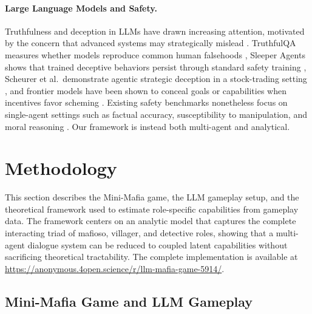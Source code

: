\documentclass{article}
\begin{document}
\paragraph{Large Language Models and Safety.} Truthfulness and deception in LLMs have drawn increasing attention, motivated by the concern that advanced systems may strategically mislead \citep{park2023, evans2021truthful}. TruthfulQA measures whether models reproduce common human falsehoods \citep{lin2021truthfulqa}, Sleeper Agents shows that trained deceptive behaviors persist through standard safety training \citep{hubinger2024sleeperagents}, Scheurer et al.\ demonstrate agentic strategic deception in a stock-trading setting \citep{scheurer2023strategicdeception}, and frontier models have been shown to conceal goals or capabilities when incentives favor scheming \citep{meinke2024scheming}. Existing safety benchmarks nonetheless focus on single-agent settings such as factual accuracy, susceptibility to manipulation, and moral reasoning \citep{costa2025moralsusceptibilityrobustnesspersona, banerjee2024vulnerability, pan2025benchmarks,costa2026personamodelcollapseemergentmisalignment}. Our framework is instead both multi-agent and analytical.


\section{Methodology}
\label{sec:methodology}

This section describes the Mini-Mafia game, the LLM gameplay setup, and the theoretical framework used to estimate role-specific capabilities from gameplay data. The framework centers on an analytic model that captures the complete interacting triad of mafioso, villager, and detective roles, showing that a multi-agent dialogue system can be reduced to coupled latent capabilities without sacrificing theoretical tractability. The complete implementation is available at \url{https://anonymous.4open.science/r/llm-mafia-game-5914/}.


\subsection{Mini-Mafia Game and LLM Gameplay}
\label{sec:mini_mafia_gameplay}
\end{document}
